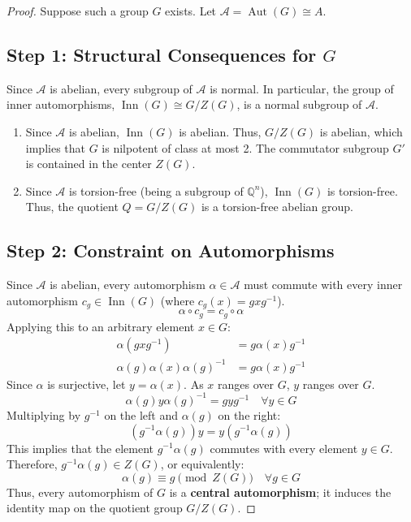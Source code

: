 \documentclass{book}
\begin{document}
\begin{proof}
Suppose such a group $G$ exists. Let $\mathcal{A} = \operatorname{Aut}(G) \cong A$.

\subsection*{Step 1: Structural Consequences for $G$}
Since $\mathcal{A}$ is abelian, every subgroup of $\mathcal{A}$ is normal. In particular, the group of inner automorphisms, $\operatorname{Inn}(G) \cong G/Z(G)$, is a normal subgroup of $\mathcal{A}$.
\begin{enumerate}
    \item Since $\mathcal{A}$ is abelian, $\operatorname{Inn}(G)$ is abelian. Thus, $G/Z(G)$ is abelian, which implies that $G$ is nilpotent of class at most 2. The commutator subgroup $G'$ is contained in the center $Z(G)$.
    \item Since $\mathcal{A}$ is torsion-free (being a subgroup of $\mathbb{Q}^n$), $\operatorname{Inn}(G)$ is torsion-free. Thus, the quotient $Q = G/Z(G)$ is a torsion-free abelian group.
\end{enumerate}

\subsection*{Step 2: Constraint on Automorphisms}
Since $\mathcal{A}$ is abelian, every automorphism $\alpha \in \mathcal{A}$ must commute with every inner automorphism $c_g \in \operatorname{Inn}(G)$ (where $c_g(x) = gxg^{-1}$).
\[
\alpha \circ c_g = c_g \circ \alpha
\]
Applying this to an arbitrary element $x \in G$:
\begin{align*}
\alpha(gxg^{-1}) &= g\alpha(x)g^{-1} \\
\alpha(g)\alpha(x)\alpha(g)^{-1} &= g\alpha(x)g^{-1}
\end{align*}
Since $\alpha$ is surjective, let $y = \alpha(x)$. As $x$ ranges over $G$, $y$ ranges over $G$.
\[
\alpha(g) y \alpha(g)^{-1} = g y g^{-1} \quad \forall y \in G
\]
Multiplying by $g^{-1}$ on the left and $\alpha(g)$ on the right:
\[
(g^{-1}\alpha(g)) y = y (g^{-1}\alpha(g))
\]
This implies that the element $g^{-1}\alpha(g)$ commutes with every element $y \in G$. Therefore, $g^{-1}\alpha(g) \in Z(G)$, or equivalently:
\[
\alpha(g) \equiv g \pmod{Z(G)} \quad \forall g \in G
\]
Thus, every automorphism of $G$ is a \textbf{central automorphism}; it induces the identity map on the quotient group $G/Z(G)$.


\end{proof}
\end{document}
